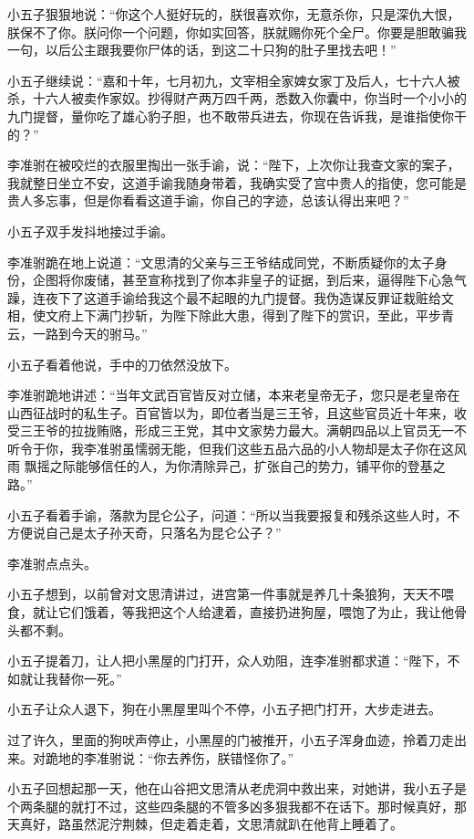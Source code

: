 小五子狠狠地说：“你这个人挺好玩的，朕很喜欢你，无意杀你，只是深仇大恨，朕保不了你。朕问你一个问题，你如实回答，朕就赐你死个全尸。你要是胆敢骗我一句，以后公主跟我要你尸体的话，到这二十只狗的肚子里找去吧！”

小五子继续说：“嘉和十年，七月初九，文宰相全家婢女家丁及后人，七十六人被杀，十六人被卖作家奴。抄得财产两万四千两，悉数入你囊中，你当时一个小小的九门提督，量你吃了雄心豹子胆，也不敢带兵进去，你现在告诉我，是谁指使你干的？”

李准驸在被咬烂的衣服里掏出一张手谕，说：“陛下，上次你让我查文家的案子，我就整日坐立不安，这道手谕我随身带着，我确实受了宫中贵人的指使，您可能是贵人多忘事，但是你看看这道手谕，你自己的字迹，总该认得出来吧？”

小五子双手发抖地接过手谕。

李准驸跪在地上说道：“文思清的父亲与三王爷结成同党，不断质疑你的太子身份，企图将你废储，甚至宣称找到了你本非皇子的证据，到后来，逼得陛下心急气躁，连夜下了这道手谕给我这个最不起眼的九门提督。我伪造谋反罪证栽赃给文相，使文府上下满门抄斩，为陛下除此大患，得到了陛下的赏识，至此，平步青云，一路到今天的驸马。”

小五子看着他说，手中的刀依然没放下。

李准驸跪地讲述：“当年文武百官皆反对立储，本来老皇帝无子，您只是老皇帝在山西征战时的私生子。百官皆以为，即位者当是三王爷，且这些官员近十年来，收受三王爷的拉拢贿赂，形成三王党，其中文家势力最大。满朝四品以上官员无一不听令于你，我李准驸虽懦弱无能，但我们这些五品六品的小人物却是太子你在这风雨
飘摇之际能够信任的人，为你清除异己，扩张自己的势力，铺平你的登基之路。”

小五子看着手谕，落款为昆仑公子，问道：“所以当我要报复和残杀这些人时，不方便说自己是太子孙天奇，只落名为昆仑公子？”

李准驸点点头。
\newline

小五子想到，以前曾对文思清讲过，进宫第一件事就是养几十条狼狗，天天不喂食，就让它们饿着，等我把这个人给逮着，直接扔进狗屋，喂饱了为止，我让他骨头都不剩。

小五子提着刀，让人把小黑屋的门打开，众人劝阻，连李准驸都求道：“陛下，不如就让我替你一死。”

小五子让众人退下，狗在小黑屋里叫个不停，小五子把门打开，大步走进去。

过了许久，里面的狗吠声停止，小黑屋的门被推开，小五子浑身血迹，拎着刀走出来。对跪地的李准驸说：“你去养伤，朕错怪你了。”

小五子回想起那一天，他在山谷把文思清从老虎洞中救出来，对她讲，我小五子是个两条腿的就打不过，这些四条腿的不管多凶多狠我都不在话下。那时候真好，那天真好，路虽然泥泞荆棘，但走着走着，文思清就趴在他背上睡着了。
\newline

